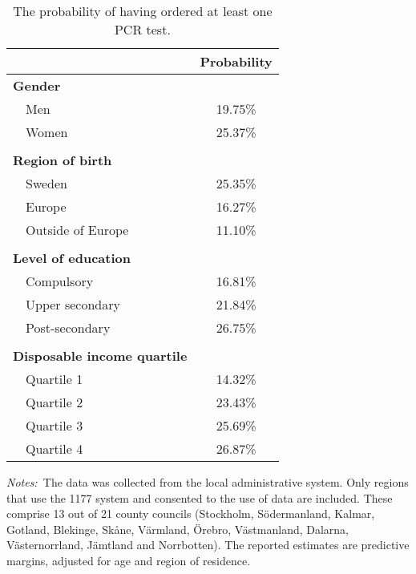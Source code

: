 \begin{table}[htbp]\centering
    \caption{The probability of having ordered at least one PCR test.}\label{tab:ordered}
    \begin{threeparttable}
        \begin{tabular}{@{}lS[table-format={}2.2{\%}]@{}}
            \toprule%
                                & {Probability} \tabularnewline%
            \midrule%
            \textbf{Gender}              &               \tabularnewline%
            ~~Men               & 19.75\%       \tabularnewline%
            ~~Women             & 25.37\%       \tabularnewline\tabularnewline%
            \textbf{Region of birth}     &               \tabularnewline%
            ~~Sweden            & 25.35\%       \tabularnewline%
            ~~Europe            & 16.27\%       \tabularnewline%
            ~~Outside of Europe & 11.10\%       \tabularnewline\tabularnewline%
            \textbf{Level of education} &               \tabularnewline%
            ~~Compulsory        & 16.81\%       \tabularnewline%
            ~~Upper secondary   & 21.84\%       \tabularnewline%
            ~~Post-secondary    & 26.75\%       \tabularnewline\tabularnewline%
            \textbf{Disposable income quartile} &               \tabularnewline%
            ~~Quartile 1        & 14.32\%       \tabularnewline%
            ~~Quartile 2        & 23.43\%       \tabularnewline%
            ~~Quartile 3        & 25.69\%       \tabularnewline%
            ~~Quartile 4        & 26.87\%       \tabularnewline%
            \bottomrule%
        \end{tabular}
        \begin{tablenotes}\footnotesize\emph{Notes:~}The data was collected from the local administrative system. Only regions that use the 1177 system and consented to the use of data are included. These comprise 13 out of 21 county councils (Stockholm, Södermanland, Kalmar, Gotland, Blekinge, Skåne, Värmland, Örebro, Västmanland, Dalarna, Västernorrland, Jämtland and Norrbotten). The reported estimates are predictive margins, adjusted for age and region of residence.\end{tablenotes}
    \end{threeparttable}
\end{table}
